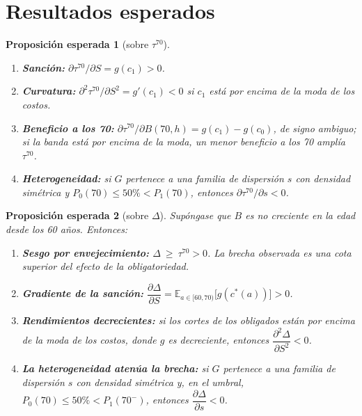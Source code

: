 \documentclass[11pt]{article}
\newtheorem*{conj}{Proposición esperada}
\begin{document}
\section{Resultados esperados}
\begin{conj}[sobre $\tau^{70}$]
\begin{enumerate}
\item[(a)] \textbf{Sanción:} $\partial\tau^{70}/\partial S=g(c_1)>0$.
\item[(b)] \textbf{Curvatura:} $\partial^2\tau^{70}/\partial S^2=g'(c_1)<0$ si $c_1$ está por encima de la moda de los costos.
\item[(c)] \textbf{Beneficio a los 70:} $\partial\tau^{70}/\partial B(70,h)=g(c_1)-g(c_0)$, de signo ambiguo; si la banda está por encima de la moda, un menor beneficio a los 70 amplía $\tau^{70}$.
\item[(d)] \textbf{Heterogeneidad:} si $G$ pertenece a una familia de dispersión $s$ con densidad simétrica y $P_0(70)\le 50\%<P_1(70)$, entonces $\partial\tau^{70}/\partial s<0$.
\end{enumerate}
\end{conj}
\begin{conj}[sobre $\Delta$]
Supóngase que $B$ es no creciente en la edad desde los 60 años. Entonces:
\begin{enumerate}
\item[(i)] \textbf{Sesgo por envejecimiento:} $\Delta\ \ge\ \tau^{70}>0$. La brecha observada es una cota superior del efecto de la obligatoriedad.
\item[(ii)] \textbf{Gradiente de la sanción:} $\dfrac{\partial\Delta}{\partial S}=\mathbb E_{a\in[60,70)}\big[g(c^*(a))\big]>0$.
\item[(iii)] \textbf{Rendimientos decrecientes:} si los cortes de los obligados están por encima de la moda de los costos, donde $g$ es decreciente, entonces $\dfrac{\partial^2\Delta}{\partial S^2}<0$.
\item[(iv)] \textbf{La heterogeneidad atenúa la brecha:} si $G$ pertenece a una familia de dispersión $s$ con densidad simétrica y, \emph{en el umbral}, $P_0(70)\le 50\%<P_1(70^-)$, entonces $\dfrac{\partial\Delta}{\partial s}<0$.
\end{enumerate}
\end{conj}
\end{document}
